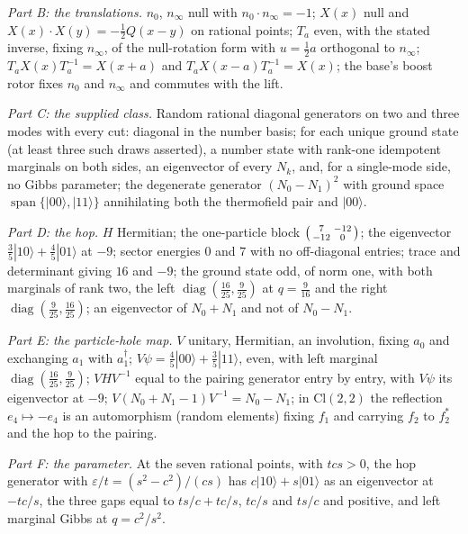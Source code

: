 \documentclass[11pt]{article}
\theoremstyle{definition}
\theoremstyle{plain}
\providecommand{\Cl}{}\renewcommand{\Cl}{\mathrm{Cl}}
\providecommand{\nInf}{}\renewcommand{\nInf}{n_\infty}
\providecommand{\nO}{}\renewcommand{\nO}{n_0}
\providecommand{\ket}{}\renewcommand{\ket}[1]{|#1\rangle}
\begin{document}
\emph{Part B: the translations.} $\nO$, $\nInf$ null with $\nO\cdot\nInf = -1$; $X(x)$ null and $X(x)\cdot X(y) = -\tfrac12 Q(x - y)$ on rational points; $T_{a}$ even, with the stated inverse, fixing $\nInf$, of the null-rotation form with $u = \tfrac12 a$ orthogonal to $\nInf$; $T_{a}X(x)T_{a}^{-1} = X(x + a)$ and $T_{a}X(x - a)T_{a}^{-1} = X(x)$; the base's boost rotor fixes $\nO$ and $\nInf$ and commutes with the lift.

\emph{Part C: the supplied class.} Random rational diagonal generators on two and three modes with every cut: diagonal in the number basis; for each unique ground state (at least three such draws asserted), a number state with rank-one idempotent marginals on both sides, an eigenvector of every $N_{k}$, and, for a single-mode side, no Gibbs parameter; the degenerate generator $(N_{0} - N_{1})^{2}$ with ground space $\operatorname{span}\{\ket{00}, \ket{11}\}$ annihilating both the thermofield pair and $\ket{00}$.

\emph{Part D: the hop.} $H$ Hermitian; the one-particle block $\begin{psmallmatrix} 7 & -12 \\ -12 & 0\end{psmallmatrix}$; the eigenvector $\tfrac35\ket{10} + \tfrac45\ket{01}$ at $-9$; sector energies $0$ and $7$ with no off-diagonal entries; trace and determinant giving $16$ and $-9$; the ground state odd, of norm one, with both marginals of rank two, the left $\operatorname{diag}(\tfrac{16}{25}, \tfrac{9}{25})$ at $q = \tfrac{9}{16}$ and the right $\operatorname{diag}(\tfrac{9}{25}, \tfrac{16}{25})$; an eigenvector of $N_{0} + N_{1}$ and not of $N_{0} - N_{1}$.

\emph{Part E: the particle-hole map.} $V$ unitary, Hermitian, an involution, fixing $a_{0}$ and exchanging $a_{1}$ with $a^{\dagger}_{1}$; $V\psi = \tfrac45\ket{00} + \tfrac35\ket{11}$, even, with left marginal $\operatorname{diag}(\tfrac{16}{25}, \tfrac{9}{25})$; $VHV^{-1}$ equal to the pairing generator entry by entry, with $V\psi$ its eigenvector at $-9$; $V(N_{0} + N_{1} - 1)V^{-1} = N_{0} - N_{1}$; in $\Cl(2,2)$ the reflection $e_{4} \mapsto -e_{4}$ is an automorphism (random elements) fixing $f_{1}$ and carrying $f_{2}$ to $f_{2}^{*}$ and the hop to the pairing.

\emph{Part F: the parameter.} At the seven rational points, with $tcs > 0$, the hop generator with $\varepsilon/t = (s^{2} - c^{2})/(cs)$ has $c\ket{10} + s\ket{01}$ as an eigenvector at $-tc/s$, the three gaps equal to $ts/c + tc/s$, $tc/s$ and $ts/c$ and positive, and left marginal Gibbs at $q = c^{2}/s^{2}$.
\end{document}
